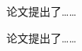 
\begin{comments}[name = {基础导师学术评语}]

  论文提出了……

\end{comments}


\begin{comments}[name = {临床导师学术评语}]

  论文提出了……

\end{comments}
